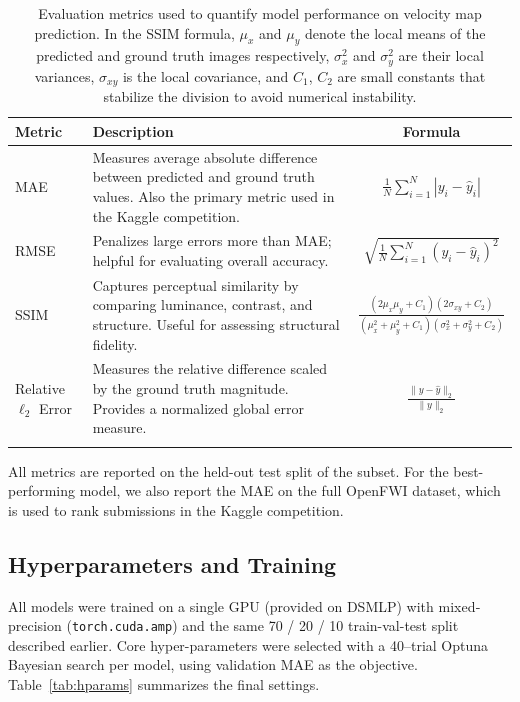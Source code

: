 \documentclass{article}
\begin{document}
\begin{table}
    \centering
    \renewcommand{\arraystretch}{1.4}
    \begin{tabular}{@{}p{1cm} p{8cm} c@{}}
    \toprule
    \textbf{Metric} & \textbf{Description} & \textbf{Formula} \\
    \midrule
    MAE & Measures average absolute difference between predicted and ground truth values. Also the primary metric used in the Kaggle competition. & 
    $\displaystyle \frac{1}{N} \sum_{i=1}^{N} |y_i - \hat{y}_i|$ \\
    \addlinespace
    RMSE & Penalizes large errors more than MAE; helpful for evaluating overall accuracy. &
    $\displaystyle \sqrt{ \frac{1}{N} \sum_{i=1}^{N} (y_i - \hat{y}_i)^2 }$ \\
    \addlinespace
    SSIM & Captures perceptual similarity by comparing luminance, contrast, and structure. Useful for assessing structural fidelity. &
    $\displaystyle \frac{(2\mu_x \mu_y + C_1)(2\sigma_{xy} + C_2)}{(\mu_x^2 + \mu_y^2 + C_1)(\sigma_x^2 + \sigma_y^2 + C_2)}$ \\
    \addlinespace
    Relative $\ell_2$ Error & Measures the relative difference scaled by the ground truth magnitude. Provides a normalized global error measure. &
    $\displaystyle \frac{ \| y - \hat{y} \|_2 }{ \| y \|_2 }$ \\
    \bottomrule
    \vspace{0.1em}
    \end{tabular}
    \caption{Evaluation metrics used to quantify model performance on velocity map prediction. In the SSIM formula, $\mu_x$ and $\mu_y$ denote the local means of the predicted and ground truth images respectively, $\sigma_x^2$ and $\sigma_y^2$ are their local variances, $\sigma_{xy}$ is the local covariance, and $C_1$, $C_2$ are small constants that stabilize the division to avoid numerical instability.}
    \label{tab:metrics}
\end{table}

All metrics are reported on the held-out test split of the subset. For the best-performing model, we also report the MAE on the full OpenFWI dataset, which is used to rank submissions in the Kaggle competition.

\subsection{Hyperparameters and Training}

All models were trained on a single GPU (provided on DSMLP) with mixed‐precision (\texttt{torch.cuda.amp}) and the same 70 / 20 / 10 train-val-test split described earlier. Core hyper-parameters were selected with a 40–trial Optuna Bayesian search per model, using validation MAE as the objective.  Table~\ref{tab:hparams} summarizes the final settings.
\end{document}
